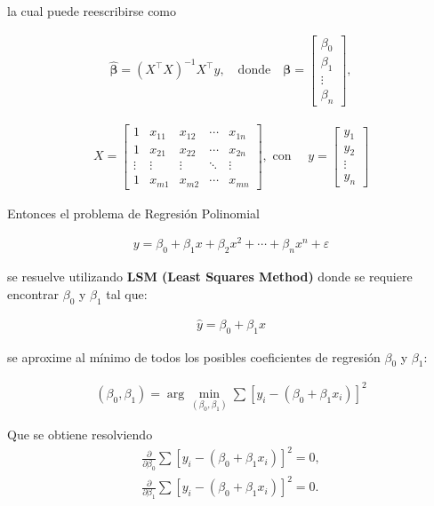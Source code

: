 \documentclass[12pt]{article}
\begin{document}
la cual puede reescribirse como

\begin{eqnarray*}
\hat{\boldsymbol{\beta}} = (X^\top X)^{-1} X^\top y, \quad \text{donde} \quad
\boldsymbol{\beta} =
\begin{bmatrix}
\beta_0 \\
\beta_1 \\
\vdots \\
\beta_n
\end{bmatrix},
\end{eqnarray*}

\begin{eqnarray*}
X =
\begin{bmatrix}
1 & x_{11} & x_{12} & \cdots & x_{1n} \\
1 & x_{21} & x_{22} & \cdots & x_{2n} \\
\vdots & \vdots & \vdots & \ddots & \vdots \\
1 & x_{m1} & x_{m2} & \cdots & x_{mn}
\end{bmatrix},\textrm{ con }
\quad
y =
\begin{bmatrix}
y_1 \\
y_2 \\
\vdots \\
y_n
\end{bmatrix}
\end{eqnarray*}

Entonces el problema de Regresión Polinomial

\begin{eqnarray*}
y = \beta_0 + \beta_1 x + \beta_2 x^2 + \cdots + \beta_n x^n + \varepsilon
\end{eqnarray*}

se resuelve utilizando \textbf{LSM (Least Squares Method)} donde se requiere encontrar $\beta_0$ y $\beta_1$ tal que:

\begin{eqnarray*}
\hat{y} = \beta_0 + \beta_1 x
\end{eqnarray*}

se aproxime al mínimo de todos los posibles coeficientes de regresión $\beta_0$ y $\beta_1$:

\begin{eqnarray*}
(\beta_0, \beta_1) = \arg \min_{(\beta_0, \beta_1)} \sum \left[ y_i - (\beta_0 + \beta_1 x_i) \right]^2
\end{eqnarray*}

Que se obtiene resolviendo
\begin{eqnarray*}
\frac{\partial}{\partial \beta_0} \sum \left[ y_i - (\beta_0 + \beta_1 x_i) \right]^2 = 0,\\
\frac{\partial}{\partial \beta_1} \sum \left[ y_i - (\beta_0 + \beta_1 x_i) \right]^2 = 0.
\end{eqnarray*}
\end{document}
